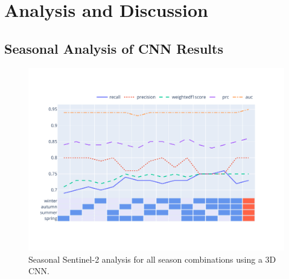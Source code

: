 \chapter{Analysis and Discussion}
\label{chapter:analysis}

\section{Seasonal Analysis of CNN Results}

\begin{figure}[ht]
    \centering
    \includegraphics[width=0.9\linewidth, trim={20pt 40pt 10pt 30pt}, clip]{figures/figures_analysis/seasonal_selection.pdf}
    \caption{Seasonal Sentinel-2 analysis for all season combinations using a 3D CNN.}
    \label{fig:seasonal_selection}
\end{figure}